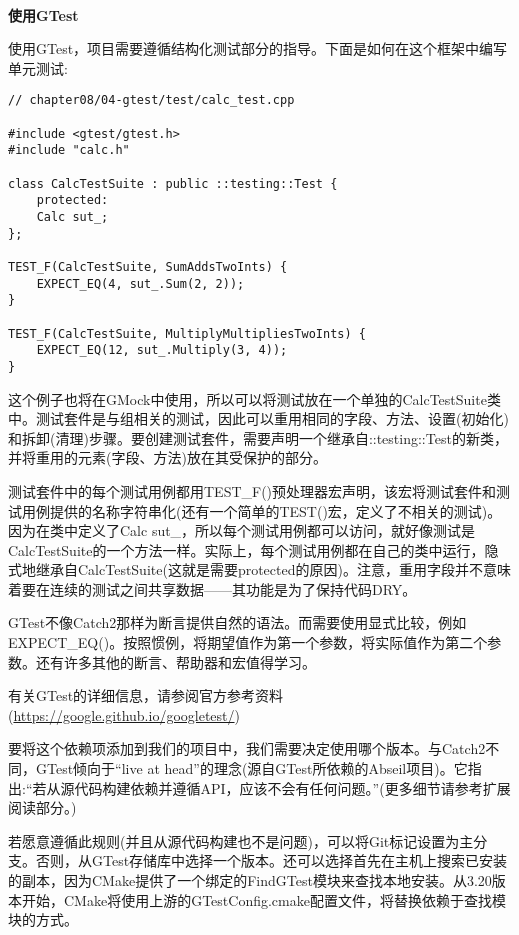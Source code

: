 \hspace*{\fill} \\ %
\noindent
\textbf{使用GTest}

使用GTest，项目需要遵循结构化测试部分的指导。下面是如何在这个框架中编写单元测试:

\begin{lstlisting}[style=styleCXX]
// chapter08/04-gtest/test/calc_test.cpp

#include <gtest/gtest.h>
#include "calc.h"

class CalcTestSuite : public ::testing::Test {
	protected:
	Calc sut_;
};

TEST_F(CalcTestSuite, SumAddsTwoInts) {
	EXPECT_EQ(4, sut_.Sum(2, 2));
}

TEST_F(CalcTestSuite, MultiplyMultipliesTwoInts) {
	EXPECT_EQ(12, sut_.Multiply(3, 4));
}
\end{lstlisting} 

这个例子也将在GMock中使用，所以可以将测试放在一个单独的CalcTestSuite类中。测试套件是与组相关的测试，因此可以重用相同的字段、方法、设置(初始化)和拆卸(清理)步骤。要创建测试套件，需要声明一个继承自::testing::Test的新类，并将重用的元素(字段、方法)放在其受保护的部分。

测试套件中的每个测试用例都用TEST\_F()预处理器宏声明，该宏将测试套件和测试用例提供的名称字符串化(还有一个简单的TEST()宏，定义了不相关的测试)。因为在类中定义了Calc sut\_，所以每个测试用例都可以访问，就好像测试是CalcTestSuite的一个方法一样。实际上，每个测试用例都在自己的类中运行，隐式地继承自CalcTestSuite(这就是需要protected的原因)。注意，重用字段并不意味着要在连续的测试之间共享数据——其功能是为了保持代码DRY。

GTest不像Catch2那样为断言提供自然的语法。而需要使用显式比较，例如EXPECT\_EQ()。按照惯例，将期望值作为第一个参数，将实际值作为第二个参数。还有许多其他的断言、帮助器和宏值得学习。

\begin{tcolorbox}[colback=blue!5!white,colframe=blue!75!black,title=Note]
有关GTest的详细信息，请参阅官方参考资料(\url{https://google.github.io/googletest/})
\end{tcolorbox}

要将这个依赖项添加到我们的项目中，我们需要决定使用哪个版本。与Catch2不同，GTest倾向于“live at head”的理念(源自GTest所依赖的Abseil项目)。它指出:“若从源代码构建依赖并遵循API，应该不会有任何问题。”(更多细节请参考扩展阅读部分。)

若愿意遵循此规则(并且从源代码构建也不是问题)，可以将Git标记设置为主分支。否则，从GTest存储库中选择一个版本。还可以选择首先在主机上搜索已安装的副本，因为CMake提供了一个绑定的FindGTest模块来查找本地安装。从3.20版本开始，CMake将使用上游的GTestConfig.cmake配置文件，将替换依赖于查找模块的方式。

